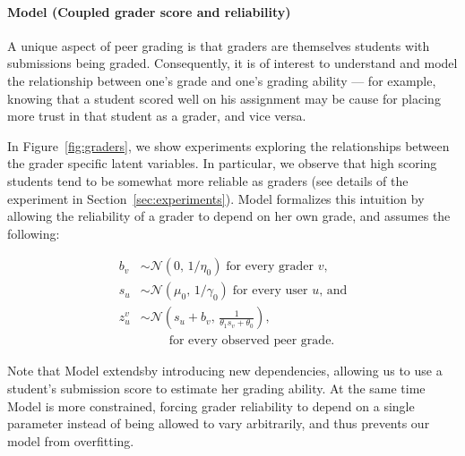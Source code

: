 \paragraph{Model \PGthree (Coupled grader score and reliability)}
A unique aspect of peer grading is that graders are themselves
students with submissions being graded. %
Consequently, it is of interest to understand and model the relationship between
one's grade and one's grading ability --- 
for example, knowing that a student
scored well on his assignment may be cause for placing more
trust in that student as a grader, and vice versa. 

In Figure~\ref{fig:graders}, we show
experiments exploring the relationships between the grader
specific latent variables. In particular, we observe
that high scoring students tend to be somewhat more reliable as graders (see details of the experiment in 
Section~\ref{sec:experiments}). Model \PGthree formalizes this
intuition by allowing the reliability of a grader to depend on
her own grade, and assumes the following:

{\footnotesize\allowdisplaybreaks
\begin{align*}
b_v &\sim \mathcal{N}(0,\,1/\eta_0) \;\mbox{for every grader $v$},\\
s_u&\sim \mathcal{N}(\mu_0,\,1/\gamma_0)  \;\mbox{for every user $u$, and}\\
z^v_u &\sim \mathcal{N}\left( s_u + b_v,\, \frac{1}{ \theta_1 s_v+ \theta_0 } \right),\\
       &\qquad  \;\mbox{for every observed peer grade.} 
\end{align*}
}

Note that Model \PGthree extends\PGone by introducing new dependencies, allowing us to use a student's submission
score to estimate her grading ability.
At the same time Model \PGthree is more constrained, forcing grader reliability to depend on a single parameter
instead of being allowed to vary arbitrarily, and thus prevents our model from overfitting.

